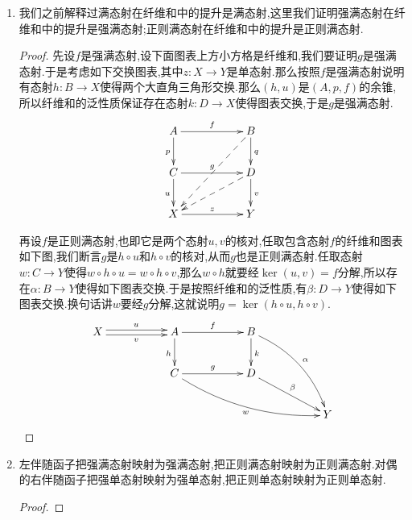 \begin{enumerate}
\begin{proof}
    	我们解释过一般范畴中强满态射总是极满态射.现在任取极满态射$f$,我们来验证它是强满态射.任取如下交换图表,其中$z$是单态射:
    	$$\xymatrix{A\ar[rr]^f\ar[d]_u&&B\ar[d]^v\\X\ar[rr]_z&&Y}$$
    	
    	记$(W,p,q)$是$v,z$的纤维积,我们解释过单态射在纤维积中的提升总是单态射,所以这里$q$是单态射.另外按照纤维积的泛性质有态射$A\to W$使得如下图表交换:
    	$$\xymatrix{A\ar@/_1pc/[ddrr]_u\ar@/^1pc/[drrrr]^f\ar[drr]^h&&&&\\&&W\ar[rr]^q\ar[d]_p&&B\ar[d]^v\\&&X\ar[rr]_z&&Y}$$
    	
    	但是按照$f$是极满态射,从$f=q\circ h$和$q$是单态射就得到$q$是同构,取$k:B\to X$为$p\circ q^{-1}$,那么有$k\circ f=p\circ q^{-1}\circ f=p\circ h=u$,也即如下图表交换,这说明$f$是强满态射.
    	$$\xymatrix{A\ar[rr]^f\ar[d]_u&&B\ar[d]^v\ar@{-->}[dll]_k\\X\ar[rr]_z&&Y}$$
    \end{proof}
    \item 我们之前解释过满态射在纤维和中的提升是满态射,这里我们证明强满态射在纤维和中的提升是强满态射;正则满态射在纤维和中的提升是正则满态射.
    \begin{proof}
    	
    	先设$f$是强满态射,设下面图表上方小方格是纤维和,我们要证明$g$是强满态射.于是考虑如下交换图表,其中$z:X\to Y$是单态射.那么按照$f$是强满态射说明有态射$h:B\to X$使得两个大直角三角形交换.那么$(h,u)$是$(A,p,f)$的余锥,所以纤维和的泛性质保证存在态射$k:D\to X$使得图表交换,于是$g$是强满态射.
    	$$\xymatrix{A\ar[rr]^f\ar[d]_p&&B\ar[d]^q\ar@{-->}[ddll]\\C\ar[rr]^g\ar[d]_u&&D\ar@{-->}[dll]\ar[d]^v\\X\ar[rr]^z&&Y}$$
    	
    	再设$f$是正则满态射,也即它是两个态射$u,v$的核对,任取包含态射$f$的纤维和图表如下图,我们断言$g$是$h\circ u$和$h\circ v$的核对,从而$g$也是正则满态射.任取态射$w:C\to Y$使得$w\circ h\circ u=w\circ h\circ v$,那么$w\circ h$就要经$\ker(u,v)=f$分解,所以存在$\alpha:B\to Y$使得如下图表交换.于是按照纤维和的泛性质,有$\beta:D\to Y$使得如下图表交换.换句话讲$w$要经$g$分解,这就说明$g=\ker(h\circ u,h\circ v)$.
    	$$\xymatrix{X\ar@<0.5ex>[rr]^u\ar@<-0.5ex>[rr]_v&&A\ar[rr]^f\ar[d]_h&&B\ar[d]^k\ar@/^1pc/[ddrr]^{\alpha}&&\\&&C\ar[rr]^g\ar@/_1pc/[drrrr]_w&&D\ar[drr]^{\beta}&&\\&&&&&&Y}$$
    \end{proof}
    \item 左伴随函子把强满态射映射为强满态射,把正则满态射映射为正则满态射.对偶的右伴随函子把强单态射映射为强单态射,把正则单态射映射为正则单态射.
    \begin{proof}
    	

\end{proof}
\end{enumerate}
